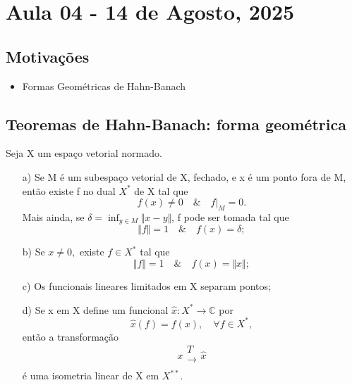 \documentclass[../functional_analysis.tex]{subfiles}
\begin{document}
\section{Aula 04 - 14 de Agosto, 2025}
\subsection{Motivações}
\begin{itemize}
	\item Formas Geométricas de Hahn-Banach
\end{itemize}
\subsection{Teoremas de Hahn-Banach: forma geométrica}
\begin{theorem*}
	Seja X um espaço vetorial normado.
	\begin{itemize}
		\item[a)] Se M é um subespaço vetorial de X, fechado, e x é um ponto fora de M, então existe f no dual \(X^{*}\) de X tal que
		      \[
			      f(x)\neq 0 \quad\&\quad f|_{M}=0.
		      \]
		      Mais ainda, se \(\delta =\inf_{y\in M}\Vert x-y \Vert\), f pode ser tomada tal que
		      \[
			      \Vert f \Vert=1 \quad\&\quad f(x)=\delta ;
		      \]
		\item[b)] Se \(x\neq 0,\) existe \(f\in X^{*}\) tal que
		      \[
			      \Vert f \Vert=1\quad\&\quad f(x)=\Vert x \Vert;
		      \]
		\item[c)] Os funcionais lineares limitados em X separam pontos;
		\item[d)] Se x em X define um funcional \(\hat{x}:X^{*}\rightarrow \mathbb{C}\) por
		      \[
			      \hat{x}(f)=f(x),\quad \forall f\in X^{*},
		      \]
		      então a transformação
		      \[
			      x \substack{T \\ \longrightarrow \\ }\hat{x}
		      \]
		      é uma isometria linear de X em \(X^{**}.\)
	\end{itemize}
\end{theorem*}
\end{document}
